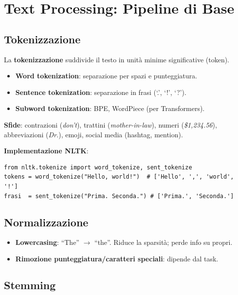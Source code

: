 \documentclass[12pt,a4paper]{article}
\begin{document}
\section{Text Processing: Pipeline di Base}

\subsection{Tokenizzazione}

La \textbf{tokenizzazione} suddivide il testo in unità minime significative (token).

\begin{itemize}[leftmargin=1.5em]
  \item \textbf{Word tokenization}: separazione per spazi e punteggiatura.
  \item \textbf{Sentence tokenization}: separazione in frasi (`.', `!', `?').
  \item \textbf{Subword tokenization}: BPE, WordPiece (per Transformers).
\end{itemize}

\textbf{Sfide}: contrazioni (\textit{don't}), trattini (\textit{mother-in-law}), numeri (\textit{\$1,234.56}), abbreviazioni (\textit{Dr.}), emoji, social media (hashtag, mention).

\textbf{Implementazione NLTK}:
\begin{lstlisting}
from nltk.tokenize import word_tokenize, sent_tokenize
tokens = word_tokenize("Hello, world!")  # ['Hello', ',', 'world', '!']
frasi  = sent_tokenize("Prima. Seconda.") # ['Prima.', 'Seconda.']
\end{lstlisting}

\subsection{Normalizzazione}

\begin{itemize}[leftmargin=1.5em]
  \item \textbf{Lowercasing}: ``The'' $\to$ ``the''. Riduce la sparsità; perde info su propri.
  \item \textbf{Rimozione punteggiatura/caratteri speciali}: dipende dal task.
\end{itemize}

\subsection{Stemming}
\end{document}
